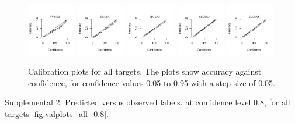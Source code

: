 \documentclass[utf8]{frontiersSCNS} %
\begin{document}
\begin{figure}[h!]
\includegraphics[width=0.19\textwidth]{figures/calibration_plots/ptgs2_calib.pdf}
\includegraphics[width=0.19\textwidth]{figures/calibration_plots/scn5a_calib.pdf}
\includegraphics[width=0.19\textwidth]{figures/calibration_plots/slc6a2_calib.pdf}
\includegraphics[width=0.19\textwidth]{figures/calibration_plots/slc6a3_calib.pdf}
\vspace*{-15pt} %
\includegraphics[width=0.19\textwidth]{figures/calibration_plots/slc6a4_calib.pdf}
    \caption{Calibration plots for all targets. The plots show accuracy against
        confidence, for confidence values 0.05 to 0.95 with a step size of 0.05.}
    \label{fig:calplots_all}
\end{figure}

Supplemental 2: Predicted versus observed labels, at confidence level 0.8,
    for all targets \ref{fig:valplots_all_0.8}.
\end{document}
